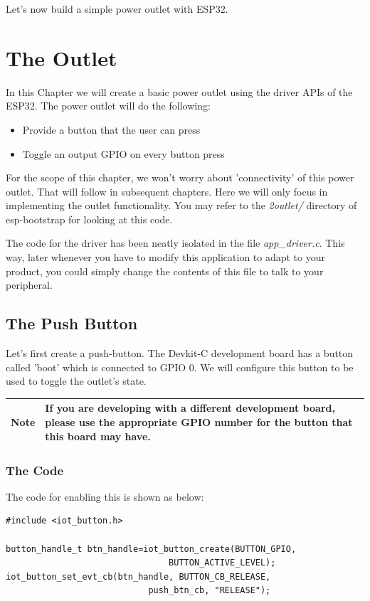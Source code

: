 \documentclass[11pt,fleqn]{book} %
\newcommand{\ksnotebox}[1]{\begin{tabularx}{\textwidth}{ |c|X| }
\hline
\cellcolor{lightgray} \textbf{Note} & #1 \\
\hline
\end{tabularx}} %
\begin{document}
Let's now build a simple power outlet with ESP32.



\chapter{The Outlet}

In this Chapter we will create a basic power outlet using the driver APIs of the ESP32. The power outlet will do the following:
\begin{itemize}
    \item Provide a button that the user can press
    \item Toggle an output GPIO on every button press
\end{itemize}
For the scope of this chapter, we won't worry about 'connectivity' of this power outlet. That will follow in subsequent chapters. Here we will only focus in implementing the outlet functionality. You may refer to the \textit{2outlet/} directory of esp-bootstrap for looking at this code. 

The code for the driver has been neatly isolated in the file \textit{app\_driver.c}. This way, later whenever you have to modify this application to adapt to your product, you could simply change the contents of this file to talk to your peripheral.

\section{The Push Button}
Let's first create a push-button. The Devkit-C development board has a button called 'boot' which is connected to GPIO 0. We will configure this button to be used to toggle the outlet's state.

\ksnotebox{If you are developing with a different development board, please use the appropriate GPIO number for the button that this board may have.}

\subsection{The Code}
The code for enabling this is shown as below:
\begin{verbatim}
#include <iot_button.h>

button_handle_t btn_handle=iot_button_create(BUTTON_GPIO,
                                BUTTON_ACTIVE_LEVEL);
iot_button_set_evt_cb(btn_handle, BUTTON_CB_RELEASE,
                            push_btn_cb, "RELEASE");

\end{verbatim}
\end{document}
